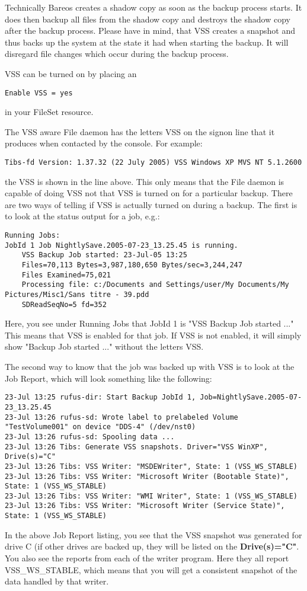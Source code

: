 Technically Bareos creates a shadow copy as soon as the backup process
starts. It does then backup all files from the shadow copy and destroys the
shadow copy after the backup process. Please have in mind, that VSS
creates a snapshot and thus backs up the system at the state it had
when starting the backup. It will disregard file changes which occur during
the backup process.

VSS can be turned on by placing an

\begin{verbatim}
Enable VSS = yes
\end{verbatim}

in your FileSet resource.

The VSS aware File daemon has the letters VSS on the signon line that
it produces when contacted by the console. For example:
\begin{verbatim}
Tibs-fd Version: 1.37.32 (22 July 2005) VSS Windows XP MVS NT 5.1.2600
\end{verbatim}
the VSS is shown in the line above. This only means that the File daemon
is capable of doing VSS not that VSS is turned on for a particular backup.
There are two ways of telling if VSS is actually turned on during a backup.
The first is to look at the status output for a job, e.g.:
\footnotesize
\begin{verbatim}
Running Jobs:
JobId 1 Job NightlySave.2005-07-23_13.25.45 is running.
    VSS Backup Job started: 23-Jul-05 13:25
    Files=70,113 Bytes=3,987,180,650 Bytes/sec=3,244,247
    Files Examined=75,021
    Processing file: c:/Documents and Settings/user/My Documents/My Pictures/Misc1/Sans titre - 39.pdd
    SDReadSeqNo=5 fd=352
\end{verbatim}
\normalsize
Here, you see under Running Jobs that JobId 1 is "VSS Backup Job started ..."
This means that VSS is enabled for that job.  If VSS is not enabled, it will
simply show "Backup Job started ..." without the letters VSS.

The second way to know that the job was backed up with VSS is to look at the
Job Report, which will look something like the following:
\footnotesize
\begin{verbatim}
23-Jul 13:25 rufus-dir: Start Backup JobId 1, Job=NightlySave.2005-07-23_13.25.45
23-Jul 13:26 rufus-sd: Wrote label to prelabeled Volume "TestVolume001" on device "DDS-4" (/dev/nst0)
23-Jul 13:26 rufus-sd: Spooling data ...
23-Jul 13:26 Tibs: Generate VSS snapshots. Driver="VSS WinXP", Drive(s)="C"
23-Jul 13:26 Tibs: VSS Writer: "MSDEWriter", State: 1 (VSS_WS_STABLE)
23-Jul 13:26 Tibs: VSS Writer: "Microsoft Writer (Bootable State)", State: 1 (VSS_WS_STABLE)
23-Jul 13:26 Tibs: VSS Writer: "WMI Writer", State: 1 (VSS_WS_STABLE)
23-Jul 13:26 Tibs: VSS Writer: "Microsoft Writer (Service State)", State: 1 (VSS_WS_STABLE)
\end{verbatim}
\normalsize
In the above Job Report listing, you see that the VSS snapshot was generated for drive C (if
other drives are backed up, they will be listed on the {\bf Drive(s)="C"}.  You also see the
reports from each of the writer program.  Here they all report VSS\_WS\_STABLE, which means
that you will get a consistent snapshot of the data handled by that writer.

